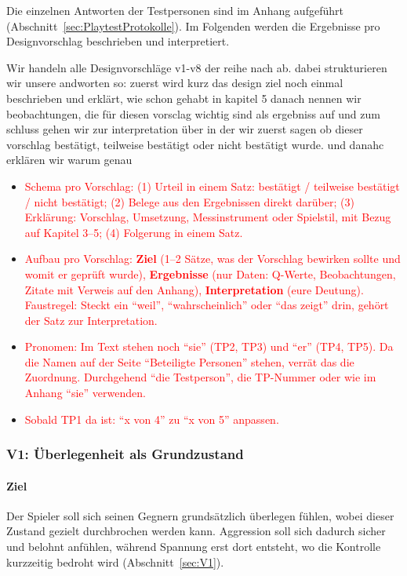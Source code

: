 \documentclass[../Main.tex]{subfiles}
\begin{document}
Die einzelnen Antworten der Testpersonen sind im Anhang aufgeführt (Abschnitt~\ref{sec:PlaytestProtokolle}). Im Folgenden werden die Ergebnisse pro Designvorschlag beschrieben und interpretiert.

Wir handeln alle Designvorschläge v1-v8 der reihe nach ab. dabei strukturieren wir unsere andworten so: zuerst wird kurz das design ziel noch einmal beschrieben und erklärt, wie schon gehabt in kapitel 5 danach nennen wir beobachtungen, die für diesen vorsclag wichtig sind als ergebniss auf und zum schluss gehen wir zur interpretation über in der wir zuerst sagen ob dieser vorschlag bestätigt, teilweise bestätigt oder nicht bestätigt wurde. und danahc erklären wir warum genau

\begin{itemize}[leftmargin=1.5cm]
    \item \textcolor{red}{Schema pro Vorschlag: (1) Urteil in einem Satz: bestätigt / teilweise bestätigt / nicht bestätigt; (2) Belege aus den Ergebnissen direkt darüber; (3) Erklärung: Vorschlag, Umsetzung, Messinstrument oder Spielstil, mit Bezug auf Kapitel 3--5; (4) Folgerung in einem Satz.}
    \item \textcolor{red}{Aufbau pro Vorschlag: \textbf{Ziel} (1--2 Sätze, was der Vorschlag bewirken sollte und womit er geprüft wurde), \textbf{Ergebnisse} (nur Daten: Q-Werte, Beobachtungen, Zitate mit Verweis auf den Anhang), \textbf{Interpretation} (eure Deutung). Faustregel: Steckt ein \enquote{weil}, \enquote{wahrscheinlich} oder \enquote{das zeigt} drin, gehört der Satz zur Interpretation.}
    \item \textcolor{red}{Pronomen: Im Text stehen noch \enquote{sie} (TP2, TP3) und \enquote{er} (TP4, TP5). Da die Namen auf der Seite \enquote{Beteiligte Personen} stehen, verrät das die Zuordnung. Durchgehend \enquote{die Testperson}, die TP-Nummer oder wie im Anhang \enquote{sie} verwenden.}
    \item \textcolor{red}{Sobald TP1 da ist: \enquote{x von 4} zu \enquote{x von 5} anpassen.}
\end{itemize}

\subsubsection{V1: Überlegenheit als Grundzustand}

\paragraph{Ziel}
Der Spieler soll sich seinen Gegnern grundsätzlich überlegen fühlen, wobei dieser Zustand gezielt durchbrochen werden kann. Aggression soll sich dadurch sicher und belohnt anfühlen, während Spannung erst dort entsteht, wo die Kontrolle kurzzeitig bedroht wird (Abschnitt~\ref{sec:V1}).
\end{document}
